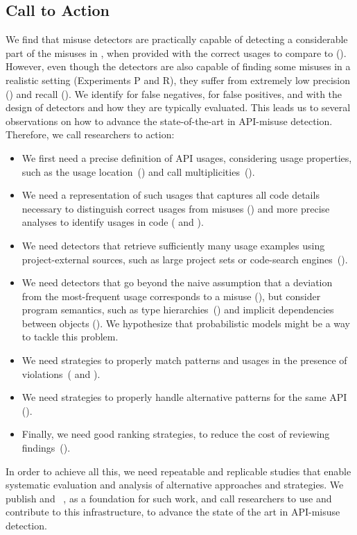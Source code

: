 \subsection{Call to Action}

We find that misuse detectors are practically capable of detecting a considerable part of the misuses in \MUBench, when provided with the correct usages to compare to ().
However, even though the detectors are also capable of finding some misuses in a realistic setting (Experiments P and R), they suffer from extremely low precision () and recall ().
%
We identify  for false negatives,  for false positives, and  with the design of detectors and how they are typically evaluated.
This leads us to several observations on how to advance the state-of-the-art in API-misuse detection.
Therefore, we call researchers to action:

\begin{itemize}
  \item We first need a precise definition of API usages, considering usage properties, such as the usage location~() and call multiplicities~().
  \item We need a representation of such usages that captures all code details necessary to distinguish correct usages from misuses () and more precise analyses to identify usages in code ( and ).
  \item We need detectors that retrieve sufficiently many usage examples using project-external sources, such as large project sets or code-search engines~().
  \item We need detectors that go beyond the naive assumption that a deviation from the most-frequent usage corresponds to a misuse (), but consider program semantics, such as type hierarchies~() and implicit dependencies between objects ().
  We hypothesize that probabilistic models might be a way to tackle this problem.
  \item We need strategies to properly match patterns and usages in the presence of violations~( and ).
  \item We need strategies to properly handle alternative patterns for the same API ().
  \item Finally, we need good ranking strategies, to reduce the cost of reviewing findings~().
\end{itemize}

In order to achieve all this, we need repeatable and replicable studies that enable systematic evaluation and analysis of alternative approaches and strategies.
We publish \MUBench and \MUPipe~\cite{mubench}, as a foundation for such work, and call researchers to use and contribute to this infrastructure, to advance the state of the art in API-misuse detection.
